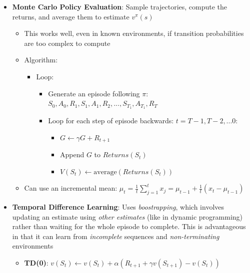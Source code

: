 \documentclass[twocolumn]{article}
\providecommand{\tightlist}{%
  \setlength{\itemsep}{\GlobalItemSep}\setlength{\parskip}{\GlobalListParSkip}}
\newlength{\GlobalItemSep}
\newlength{\GlobalListParSkip}
\begin{document}
\begin{itemize}
\tightlist
\item
  \textbf{Monte Carlo Policy Evaluation}: Sample trajectories, compute
  the returns, and average them to estimate \(v^\pi(s)\)

  \begin{itemize}
  \tightlist
  \item
    This works well, even in known environments, if transition
    probabilities are too complex to compute
  \item
    Algorithm:

    \begin{itemize}
    \tightlist
    \item
      Loop:

      \begin{itemize}
      \tightlist
      \item
        Generate an episode following \(\pi\):
        \(S_0, A_0, R_1, S_1, A_1, R_2, ..., S_{T_1}, A_{T_1}, R_T\)
      \item
        Loop for each step of episode backwards:
        \(t = T - 1, T - 2, ... 0\):

        \begin{itemize}
        \tightlist
        \item
          \(G \leftarrow \gamma G + R_{t+1}\)
        \item
          Append \(G\) to \(Returns(S_t)\)
        \item
          \(V(S_t) \leftarrow \text{average}(Returns(S_t))\)
        \end{itemize}
      \end{itemize}
    \end{itemize}
  \item
    Can use an incremental mean:
    \(\mu_t = \frac{1}{t} \sum_{j=1}^t x_j = \mu_{t-1} + \frac{1}{t}(x_t - \mu_{t-1})\)
  \end{itemize}
\item
  \textbf{Temporal Difference Learning}: Uses \emph{boostrapping}, which
  involves updating an estimate using \emph{other estimates} (like in
  dynamic programming) rather than waiting for the whole episode to
  complete. This is advantageous in that it can learn from
  \emph{incomplete} sequences and \emph{non-terminating} environments

  \begin{itemize}
  \tightlist
  \item
    \textbf{TD(0)}:
    \(v(S_t) \leftarrow v(S_t) + \alpha (R_{t+1} + \gamma v(S_{t+1}) - v(S_t))\)


\end{itemize}
\end{itemize}
\end{document}
